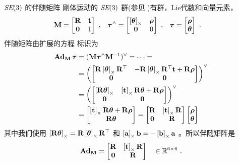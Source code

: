 
\begin{fexample}{$\textit{SE}(3)$ 的伴随矩阵}\label{ex:SE3_adjoint}
%
刚体运动的 $\textit{SE}(3)$ 群(参见 )有群，Lie代数和向量元素，
%
\begin{align*}
{\bf M}&=\begin{bmatrix}{\bf R}&{\bf t}\\\bf0&1\end{bmatrix}
~,
&
{\bm \tau}^\wedge&=\begin{bmatrix}\left[{{\bm \theta}}\right]_\times&{\bm \rho}\\\bf0&0\end{bmatrix}
~,
&
{\bm \tau} &=\begin{bmatrix}{\bm \rho}\\{{\bm \theta}}\end{bmatrix}
~.
\end{align*}
%
伴随矩阵由扩展的方程  标识为
%
\begin{align*}
{\mathbf{Ad}_{{\bf M}}}\,{\bm \tau}
  &= ({\bf M}{\bm \tau}^\wedge{\bf M}^{-1})^\vee = \cdots =
  \\
  &= \left(\begin{bmatrix}{\bf R}\left[{{\bm \theta}}\right]_\times{\bf R}^{\top} & -{\bf R}\left[{{\bm \theta}}\right]_\times{\bf R}^{\top}{\bf t} + {\bf R}{\bm \rho} \\ \bf0 & \bf0\end{bmatrix}\right)^\vee \\
  &= \left(\begin{bmatrix}\left[{\bf R}{{\bm \theta}}\right]_\times & \left[{\bf t}\right]_\times{\bf R}{{\bm \theta}} + {\bf R}{\bm \rho} \\ \bf0 & \bf0\end{bmatrix}\right)^\vee \\
  &= \begin{bmatrix}\left[{\bf t}\right]_\times{\bf R}{{\bm \theta}} + {\bf R}{\bm \rho} \\ {\bf R}{{\bm \theta}}\end{bmatrix} 
  = \begin{bmatrix}{\bf R} & \left[{\bf t}\right]_\times{\bf R}\\ \bf0&{\bf R}\end{bmatrix}\begin{bmatrix}{\bm \rho} \\ {{\bm \theta}}\end{bmatrix} 
\end{align*}
%
其中我们使用 $\left[{\bf R}{{\bm \theta}}\right]_\times={\bf R}\left[{{\bm \theta}}\right]_\times{\bf R}^{\top}$ 和 $\left[{\bf a}\right]_\times{\bf b}=-\left[{\bf b}\right]_\times{\bf a}$ 。所以伴随矩阵是 
%
\begin{align*}
{\mathbf{Ad}_{{\bf M}}} =  \begin{bmatrix}{\bf R} & \left[{\bf t}\right]_\times{\bf R} \\ \bf0&{\bf R}\end{bmatrix} \quad\in{\mathbb R}^{6\times6}
~.
\end{align*}
%
\end{fexample}		
